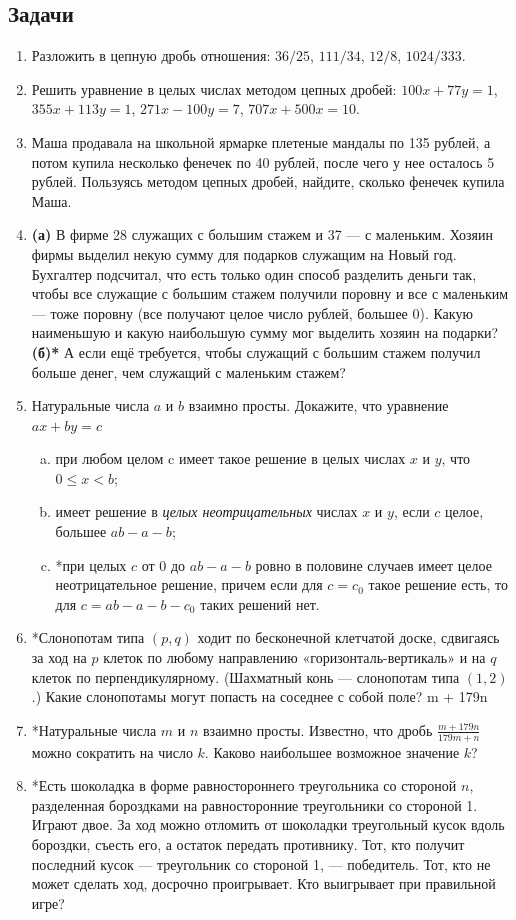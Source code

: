 \subsection*{Задачи}

\begin{enumerate}
\item Разложить в цепную дробь отношения: $36/25$, $111/34$, $12/8$, $1024/333$.
\item Решить уравнение в целых числах методом цепных дробей: $100x + 77y = 1$, $355x+113y=1$, $271x-100y=7$, $707x+500x=10$.
\item Маша продавала на школьной ярмарке плетеные мандалы по 135 рублей, а потом купила несколько фенечек по 40 рублей, после чего у нее осталось 5 рублей. Пользуясь методом цепных дробей, найдите, сколько фенечек купила Маша.

\item \textbf{(а)} В фирме 28 служащих с большим стажем и 37 --- с маленьким. Хозяин фирмы выделил
 некую сумму для подарков служащим на Новый год. Бухгалтер подсчитал, что есть только
один способ разделить деньги так, чтобы все служащие с большим стажем получили поровну и все
с маленьким --- тоже поровну (все получают целое число рублей, большее 0). Какую наименьшую
и какую наибольшую сумму мог выделить хозяин на подарки? \textbf{(б)*} А если ещё требуется, чтобы
служащий с большим стажем получил больше денег, чем служащий с маленьким стажем?

\item Натуральные числа $a$ и $b$ взаимно просты. Докажите, что уравнение $ax + by = c$
\begin{enumerate}[a)]
\item при любом целом c имеет такое решение в целых числах $x$ и $y$, что $0 \le x < b$;
\item имеет решение в \textit{целых неотрицательных} числах $x$ и $y$, если $c$ целое, большее $ab - a - b$;
\item *при целых $c$ от 0 до $ab - a - b$ ровно в половине случаев имеет целое неотрицательное решение,
причем если для $c = c_0$ такое решение есть, то для $c = ab - a - b - c_0$ таких решений нет.
\end{enumerate}
\item *Слонопотам типа $(p, q)$ ходит по бесконечной клетчатой доске, сдвигаясь за ход на $p$
клеток по любому направлению «горизонталь-вертикаль» и на $q$ клеток по перпендикулярному. (Шахматный конь --- слонопотам типа $(1,2)$.) Какие слонопотамы могут попасть на соседнее с собой поле?
m + 179n
\item *Натуральные числа $m$ и $n$ взаимно просты. Известно, что дробь $\displaystyle\frac{m + 179n}{179m + n}$
можно сократить на число $k$. Каково наибольшее возможное значение $k$?
\item *Есть шоколадка в форме равностороннего треугольника со стороной $n$, разделенная
бороздками на равносторонние треугольники со стороной 1. Играют двое. За ход можно отломить
от шоколадки треугольный кусок вдоль бороздки, съесть его, а остаток передать противнику. Тот,
кто получит последний кусок --- треугольник со стороной 1, --- победитель. Тот, кто не может сделать
ход, досрочно проигрывает. Кто выигрывает при правильной игре?


\end{enumerate}
